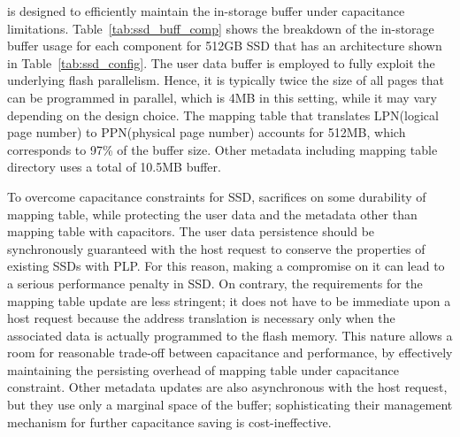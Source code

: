 \ours{} is designed to efficiently maintain the in-storage buffer under capacitance limitations. 
Table~\ref{tab:ssd_buff_comp} shows the breakdown of the in-storage buffer usage for each component
for 512GB SSD that has an architecture shown in Table~\ref{tab:ssd_config}. 
The user data buffer is employed to fully exploit the underlying flash parallelism.
Hence, it is typically twice the size of all pages that can be programmed in parallel, 
which is 4MB in this setting, while it may vary depending on the design choice. 
The mapping table that translates LPN(logical page number) to PPN(physical page number) 
accounts for 512MB, which corresponds to 97\% of the buffer size. 
Other metadata including mapping table directory uses a total of 10.5MB buffer. 

To overcome capacitance constraints for SSD, \ours{} sacrifices on some durability of mapping table, 
while protecting the user data and the metadata other than mapping table with capacitors. 
The user data persistence should be synchronously guaranteed with the host request
to conserve the properties of existing SSDs with PLP. 
For this reason, making a compromise on it can lead to a serious performance penalty in SSD.
On contrary, the requirements for the mapping table update are less stringent;
it does not have to be immediate upon a host request because the address translation is 
necessary only when the associated data is actually programmed to the flash memory. 
This nature allows a room for reasonable trade-off between capacitance and performance,
by effectively maintaining the persisting overhead of mapping table under capacitance constraint. 
Other metadata updates are also asynchronous with the host request, but
they use only a marginal space of the buffer; sophisticating their management mechanism 
for further capacitance saving is cost-ineffective. 

